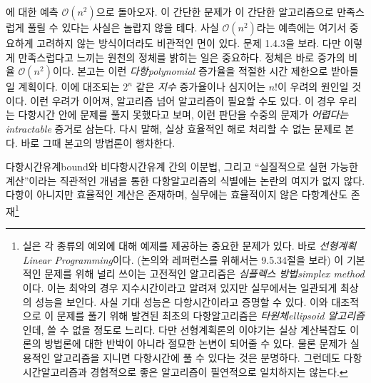 \documentclass[a4paper,chapter,atbegshi,]{oblivoir}
\begin{document}
에 대한 예측  $\mathcal{O}(n^2)$으로 돌아오자. 
이 간단한 문제가 이 간단한 알고리즘으로 만족스럽게 풀릴 수 있다는 사실은 놀랍지
않을 테다. 사실 $\mathcal{O}(n^2)$라는 예측에는 여기서 중요하게 고려하지 않는 
방식이더라도 비관적인 면이 있다. 문제 1.4.3을 보라.
다만 이렇게 만족스럽다고 느끼는 원천의 정체를 밝히는 일은 중요하다.
정체은 바로 증가의 비율 $\mathcal{O}(n^2)$이다. 
본고는 이런 \emph{다항\footnotesize polynomial} 증가율을 적절한 시간
제한으로 받아들일 계획이다. 이에 대조되는 $2^n$ 같은 \emph{지수} 증가율이나
심지어는 $n!$이 우려의 원인일 것이다. 이런 우려가 이어져, 알고리즘
넘어 알고리즘이 필요할 수도 있다. 이 경우 우리는 다항시간 안에 문제를 풀지
못했다고 보며, 이런 판단을 수중의 문제가 \emph{어렵다는\footnotesize intractable}
증거로 삼는다. 다시 말해, 실상 효율적인 해로 처리할 수 없는 문제로 본다.
바로 그때 본고의 방법론이 행차한다.  

다항시간유계{\footnotesize bound}와 비다항시간유계 간의 이분법, 그리고 
``실질적으로 실현 가능한 계산''이라는 직관적인 개념을 통한 다항알고리즘의
식별에는 논란의 여지가 없지 않다. 다항이 아니지만 효율적인 계산은 존재하며, 
실무에는 효율적이지 않은 다항계산도 존재\footnote[2]{실은 각 종류의 예외에
대해 예제를 제공하는 중요한 문제가 있다. 바로 \emph{선형계획\footnotesize
Linear Programming}이다. (논의와 레퍼런스를 위해서는 9.5.34절을 보라) 
이 기본적인 문제를 위해 널리 쓰이는 고전적인 알고리즘은 \emph{심플렉스
방법\footnotesize simplex method}이다. 이는 최악의 경우 지수시간이라고
알려져 있지만 실무에서는 일관되게 최상의 성능을 보인다. 사실 기대 성능은
다항시간이라고 증명할 수 있다. 이와 대조적으로 이 문제를 풀기 위해 발견된
최초의 다항알고리즘은 \emph{타원체{\footnotesize}ellipsoid 알고리즘}인데,
쓸 수 없을 정도로 느리다. 다만 선형계획론의 이야기는 실상 계산복잡도 이론의
방법론에 대한 반박이 아니라 절묘한 논변이 되어줄 수 있다. 물론 문제가 실용적인 
알고리즘을 지니면 다항시간에 풀 수 있다는 것은 분명하다. 그런데도
다항시간알고리즘과 경험적으로 좋은 알고리즘이 필연적으로 일치하지는 않는다.} 
\end{document}
